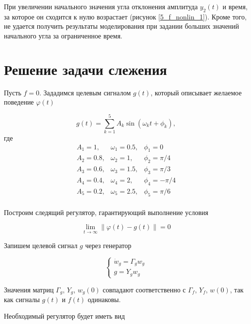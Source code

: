 При увеличении начального значения угла отклонения амплитуда $y_2(t)$ и время, за которое он сходится к нулю возрастает (рисунок \ref{5_f_nonlin_1}). Кроме того, не удается получить результаты моделирования при задании больших значений начального угла  за ограниченное время.





\section{Решение задачи слежения}

Пусть $f=0$. Зададимся целевым сигналом $g(t)$, который описывает желаемое поведение $\varphi (t)$

\begin{equation}
	g(t) = \sum \limits_{k=1}^5 A_k \sin(\omega_kt+\phi_k),
\end{equation}
где
\begin{equation}
	\begin{matrix}
		A_1 = 1, & \omega_1 = 0.5, & \phi_1 = 0\\
		A_2 = 0.8, & \omega_2 = 1, & \phi_2 = \pi /4\\
		A_3 = 0.6, & \omega_3 = 1.5, & \phi_3 = \pi /3\\
		A_4 = 0.4, & \omega_4 = 2, & \phi_4 = -\pi/4\\
		A_5= 0.2, & \omega_5 = 2.5, & \phi_5 = \pi / 6\\
	\end{matrix}
\end{equation}

Построим следящий регулятор, гарантирующий выполнение условия

\begin{equation}
	\lim \limits_{t\to \infty} \| \varphi (t) - g(t) \| = 0
\end{equation}

Запишем целевой сигнал $g$ через генератор

\begin{equation}
\begin{cases}
	\dot{w}_g = \Gamma_g w_g\\
	g = Y_g w_g
\end{cases}
\end{equation}

Значения матриц $\Gamma_g$, $Y_g$, $w_g(0)$ совпадают соответственно с $\Gamma_f$, $Y_f$, $w(0)$, так как сигналы $g(t)$ и $f(t)$ одинаковы.

Необходимый регулятор будет иметь вид

